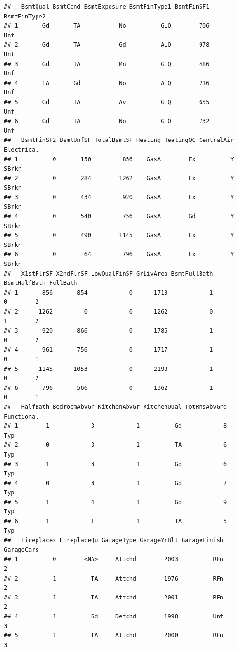 \documentclass[
]{article}
\begin{document}
\begin{verbatim}
##   BsmtQual BsmtCond BsmtExposure BsmtFinType1 BsmtFinSF1 BsmtFinType2
## 1       Gd       TA           No          GLQ        706          Unf
## 2       Gd       TA           Gd          ALQ        978          Unf
## 3       Gd       TA           Mn          GLQ        486          Unf
## 4       TA       Gd           No          ALQ        216          Unf
## 5       Gd       TA           Av          GLQ        655          Unf
## 6       Gd       TA           No          GLQ        732          Unf
##   BsmtFinSF2 BsmtUnfSF TotalBsmtSF Heating HeatingQC CentralAir Electrical
## 1          0       150         856    GasA        Ex          Y      SBrkr
## 2          0       284        1262    GasA        Ex          Y      SBrkr
## 3          0       434         920    GasA        Ex          Y      SBrkr
## 4          0       540         756    GasA        Gd          Y      SBrkr
## 5          0       490        1145    GasA        Ex          Y      SBrkr
## 6          0        64         796    GasA        Ex          Y      SBrkr
##   X1stFlrSF X2ndFlrSF LowQualFinSF GrLivArea BsmtFullBath BsmtHalfBath FullBath
## 1       856       854            0      1710            1            0        2
## 2      1262         0            0      1262            0            1        2
## 3       920       866            0      1786            1            0        2
## 4       961       756            0      1717            1            0        1
## 5      1145      1053            0      2198            1            0        2
## 6       796       566            0      1362            1            0        1
##   HalfBath BedroomAbvGr KitchenAbvGr KitchenQual TotRmsAbvGrd Functional
## 1        1            3            1          Gd            8        Typ
## 2        0            3            1          TA            6        Typ
## 3        1            3            1          Gd            6        Typ
## 4        0            3            1          Gd            7        Typ
## 5        1            4            1          Gd            9        Typ
## 6        1            1            1          TA            5        Typ
##   Fireplaces FireplaceQu GarageType GarageYrBlt GarageFinish GarageCars
## 1          0        <NA>     Attchd        2003          RFn          2
## 2          1          TA     Attchd        1976          RFn          2
## 3          1          TA     Attchd        2001          RFn          2
## 4          1          Gd     Detchd        1998          Unf          3
## 5          1          TA     Attchd        2000          RFn          3

\end{verbatim}
\end{document}
